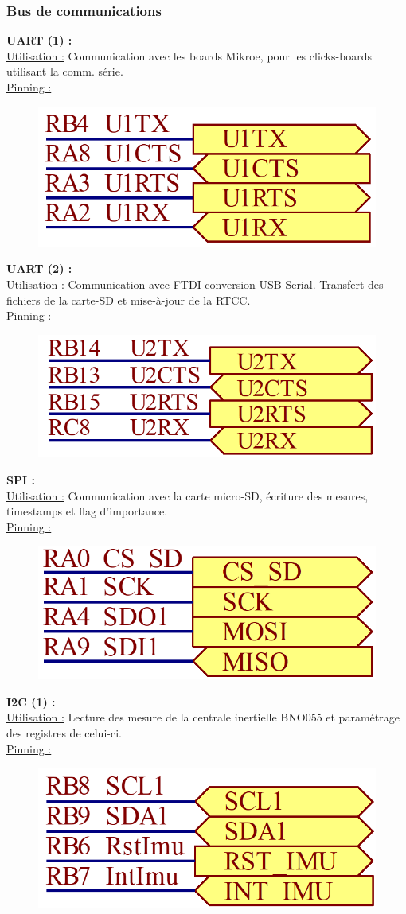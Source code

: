 {{		
	}

	\clearpage
	\subsubsection{Bus de communications}
	{
		\textbf{UART (1) :} \\
		\underline{Utilisation :} Communication avec les boards Mikroe, pour les clicks-boards utilisant la comm. série. \\
		\underline{Pinning :} \vspace{-6mm}
		\begin{figure}[h]
			\centering
			\includegraphics[width=0.25\linewidth]{Figures/Dev-SCH/UART1}
			\label{fig:uart1}
		\end{figure}		
	
		\textbf{UART (2) :} \\
		\underline{Utilisation :} Communication avec FTDI conversion USB-Serial. Transfert des fichiers de la carte-SD et mise-à-jour de la RTCC. \\
		\underline{Pinning :} \vspace{-6mm}
		\begin{figure}[h]
			\centering
			\includegraphics[width=0.25\linewidth]{Figures/Dev-SCH/UART2}
			\label{fig:uart2}
		\end{figure}		
	
		\textbf{SPI :} \\
		\underline{Utilisation :} Communication avec la carte micro-SD, écriture des mesures, timestamps et flag d'importance. \\
		\underline{Pinning :} \vspace{-6mm}
		\begin{figure}[h]
			\centering
			\includegraphics[width=0.25\linewidth]{Figures/Dev-SCH/SPI}
			\label{fig:spi}
		\end{figure}
	
		\textbf{I2C (1) :} \\
		\underline{Utilisation :} Lecture des mesure de la centrale inertielle BNO055 et paramétrage des registres de celui-ci. \\
		\underline{Pinning :} \vspace{-6mm}
		\begin{figure}[h!]
			\centering
			\includegraphics[width=0.25\linewidth]{Figures/Dev-SCH/I2C1}
			\label{fig:i2c1}
		\end{figure}
	
}}
